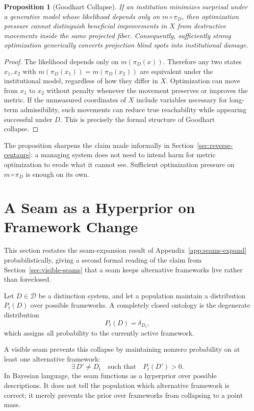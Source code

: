 \documentclass[11pt]{article}
\theoremstyle{plain}
\newtheorem{proposition}{Proposition}[section]
\begin{document}
\begin{proposition}[Goodhart Collapse]
If an institution minimizes surprisal under a generative model whose likelihood depends only on $m \circ \pi_D$, then optimization pressure cannot distinguish beneficial improvements in $X$ from destructive movements inside the same projected fiber. Consequently, sufficiently strong optimization generically converts projection blind spots into institutional damage.
\end{proposition}
\begin{proof}
The likelihood depends only on $m(\pi_D(x))$. Therefore any two states $x_1, x_2$ with $m(\pi_D(x_1)) = m(\pi_D(x_2))$ are equivalent under the institutional model, regardless of how they differ in $X$. Optimization can move from $x_1$ to $x_2$ without penalty whenever the movement preserves or improves the metric. If the unmeasured coordinates of $X$ include variables necessary for long-term admissibility, such movements can reduce true reachability while appearing successful under $D$. This is precisely the formal structure of Goodhart collapse.
\end{proof}

The proposition sharpens the claim made informally in Section~\ref{sec:reverse-centaurs}: a managing system does not need to intend harm for metric optimization to erode what it cannot see. Sufficient optimization pressure on $m \circ \pi_D$ is enough on its own.

\section{A Seam as a Hyperprior on Framework Change}
\label{app:seam-hyperprior}

\noindent This section restates the seam-expansion result of Appendix~\ref{app:seams-expand} probabilistically, giving a second formal reading of the claim from Section~\ref{sec:visible-seams} that a seam keeps alternative frameworks live rather than foreclosed.

Let $D \in \mathcal{D}$ be a distinction system, and let a population maintain a distribution $P_t(D)$ over possible frameworks. A completely closed ontology is the degenerate distribution
\[
P_t(D) = \delta_{D_t},
\]
which assigns all probability to the currently active framework.

A visible seam prevents this collapse by maintaining nonzero probability on at least one alternative framework:
\[
\exists\, D' \neq D_t \quad \text{such that} \quad P_t(D') > 0.
\]
In Bayesian language, the seam functions as a hyperprior over possible descriptions. It does not tell the population which alternative framework is correct; it merely prevents the prior over frameworks from collapsing to a point mass.
\end{document}
